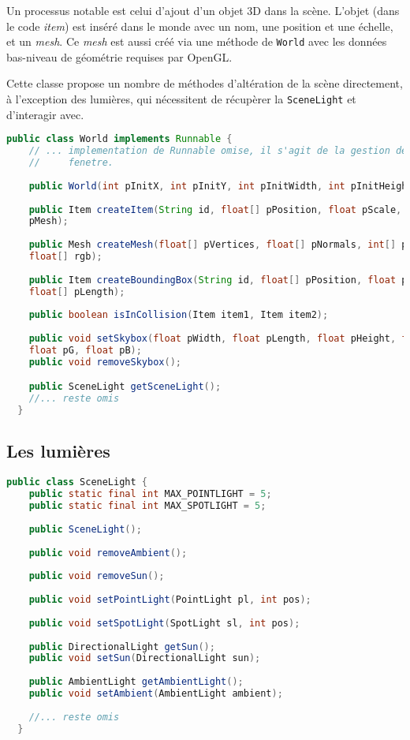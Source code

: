 \documentclass{report}
\begin{document}
Un processus notable est celui d'ajout d'un objet 3D dans la scène.
L'objet (dans le code \emph{item}) est inséré dans le monde avec un nom, une
position et une échelle, et un \emph{mesh}.
Ce \emph{mesh} est aussi créé via une méthode de \lstinline|World| avec les
données bas-niveau de géométrie requises par OpenGL.

Cette classe propose un nombre de méthodes d'altération de la scène directement,
à l'exception des lumières, qui nécessitent de récupèrer la
\lstinline|SceneLight| et d'interagir avec.

\begin{lstlisting}[caption=Interface incomplète de la classe World, label={lst:worldclass},language=Java]
  public class World implements Runnable {
    // ... implementation de Runnable omise, il s'agit de la gestion de la
    //     fenetre.
    
    public World(int pInitX, int pInitY, int pInitWidth, int pInitHeight);
    
    public Item createItem(String id, float[] pPosition, float pScale, Mesh
    pMesh);
    
    public Mesh createMesh(float[] pVertices, float[] pNormals, int[] pIndices,
    float[] rgb);
    
    public Item createBoundingBox(String id, float[] pPosition, float pScale,
    float[] pLength);
    
    public boolean isInCollision(Item item1, Item item2);
    
    public void setSkybox(float pWidth, float pLength, float pHeight, float pR,
    float pG, float pB);
    public void removeSkybox();

    public SceneLight getSceneLight();
    //... reste omis
  }
\end{lstlisting}

\subsection{Les lumières}

\begin{lstlisting}[caption=Interface incomplète de la classe SceneLight, label={lst:lightsclass},language=Java]
  public class SceneLight {
    public static final int MAX_POINTLIGHT = 5;
    public static final int MAX_SPOTLIGHT = 5;
 
    public SceneLight();
     
    public void removeAmbient();
    
    public void removeSun();
   
    public void setPointLight(PointLight pl, int pos);
    
    public void setSpotLight(SpotLight sl, int pos);
 
    public DirectionalLight getSun();
    public void setSun(DirectionalLight sun);
    
    public AmbientLight getAmbientLight();
    public void setAmbient(AmbientLight ambient);
    
    //... reste omis
  }
\end{lstlisting}
\end{document}

